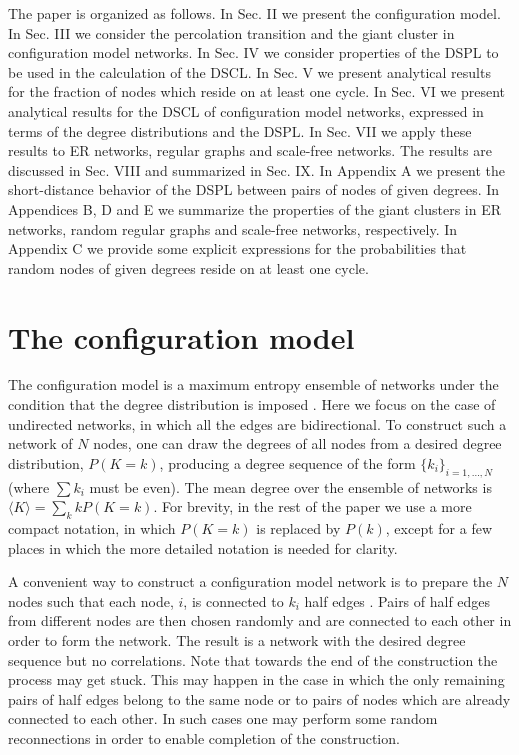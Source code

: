 \documentclass[preprint,pre,superscriptaddress,showpacs]{revtex4}
\begin{document}
The paper is organized as follows.
In Sec. II we present the configuration model.
In Sec. III we consider the percolation transition
and the giant cluster in configuration model networks.
In Sec. IV we consider properties of the DSPL to be used in the
calculation of the DSCL.
In Sec. V we present analytical results for the fraction of nodes
which reside on at least one cycle.
In Sec. VI we present analytical results for the DSCL
of configuration model networks, expressed in terms of the degree distributions
and the DSPL.
In Sec. VII we apply these results to ER networks, regular graphs and 
scale-free networks.
The results are discussed in Sec. VIII and summarized in Sec. IX.
In Appendix A we present the short-distance behavior of 
the DSPL between pairs of nodes of given degrees.
In Appendices B, D and E we summarize the properties of the giant
clusters in ER networks, random regular graphs and scale-free networks,
respectively.  In Appendix C we provide some explicit expressions for 
the probabilities that random nodes of given degrees reside on at least one cycle.

\section{The configuration model}

The configuration model is a maximum entropy ensemble of
networks under the condition that the degree distribution
is imposed
\cite{Newman2001,Newman2010}.
Here we focus on the case of undirected networks, in 
which all the edges are bidirectional.
To construct such a network of $N$ nodes, one can draw
the degrees of all nodes from a desired degree
distribution, 
$P(K=k)$,
producing a degree sequence of the form
$\{ k_i \}_{i=1,\dots,N}$
(where $\sum k_i$ must be even).
The mean degree over the ensemble of networks is
$\langle K \rangle=\sum_k k P(K=k)$.
For brevity, in the rest of the paper
we use a more compact notation, 
in which $P(K = k)$
is replaced by $P(k)$, 
except for a few places in which the more
detailed notation is needed for clarity.


A convenient way to construct a configuration model network 
is to prepare the $N$ nodes such that each node, $i$, is 
connected to $k_i$ half edges
\cite{Newman2010}.
Pairs of half edges 
from different nodes
are then chosen randomly
and are connected to each other in order
to form the network. 
The result is a network with the desired degree sequence but
no correlations.
Note that towards the end of the construction
the process may get stuck.
This may happen in the case in which the only remaining pairs of half edges
belong to the same node or to pairs of nodes which are already connected to each other.
In such cases one may perform some random reconnections 
in order to enable completion of the construction.
\end{document}
